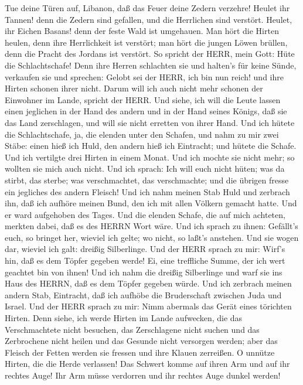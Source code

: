  Tue deine Türen auf, Libanon, daß das Feuer deine Zedern
verzehre!  Heulet ihr Tannen! denn die Zedern sind gefallen,
und die Herrlichen sind verstört. Heulet, ihr Eichen Basans! denn der
feste Wald ist umgehauen.  Man hört die Hirten heulen, denn
ihre Herrlichkeit ist verstört; man hört die jungen Löwen brüllen, denn
die Pracht des Jordans ist verstört.  So spricht der HERR,
mein Gott: Hüte die Schlachtschafe!  Denn ihre Herren
schlachten sie und halten's für keine Sünde, verkaufen sie und sprechen:
Gelobt sei der HERR, ich bin nun reich! und ihre Hirten schonen ihrer
nicht.  Darum will ich auch nicht mehr schonen der Einwohner
im Lande, spricht der HERR. Und siehe, ich will die Leute lassen einen
jeglichen in der Hand des andern und in der Hand seines Königs, daß sie
das Land zerschlagen, und will sie nicht erretten von ihrer Hand.
 Und ich hütete die Schlachtschafe, ja, die elenden unter
den Schafen, und nahm zu mir zwei Stäbe: einen hieß ich Huld, den andern
hieß ich Eintracht; und hütete die Schafe.  Und ich
vertilgte drei Hirten in einem Monat. Und ich mochte sie nicht mehr; so
wollten sie mich auch nicht.  Und ich sprach: Ich will euch
nicht hüten; was da stirbt, das sterbe; was verschmachtet, das
verschmachte; und die übrigen fresse ein jegliches des andern Fleisch!
 Und ich nahm meinen Stab Huld und zerbrach ihn, daß ich
aufhöre meinen Bund, den ich mit allen Völkern gemacht hatte.
 Und er ward aufgehoben des Tages. Und die elenden Schafe,
die auf mich achteten, merkten dabei, daß es des HERRN Wort wäre.
 Und ich sprach zu ihnen: Gefällt's euch, so bringet her,
wieviel ich gelte; wo nicht, so laßt's anstehen. Und sie wogen dar,
wieviel ich galt: dreißig Silberlinge.  Und der HERR sprach
zu mir: Wirf's hin, daß es dem Töpfer gegeben werde! Ei, eine treffliche
Summe, der ich wert geachtet bin von ihnen! Und ich nahm die dreißig
Silberlinge und warf sie ins Haus des HERRN, daß es dem Töpfer gegeben
würde.  Und ich zerbrach meinen andern Stab, Eintracht, daß
ich aufhöbe die Bruderschaft zwischen Juda und Israel.  Und
der HERR sprach zu mir: Nimm abermals das Gerät eines törichten Hirten.
 Denn siehe, ich werde Hirten im Lande aufwecken, die das
Verschmachtete nicht besuchen, das Zerschlagene nicht suchen und das
Zerbrochene nicht heilen und das Gesunde nicht versorgen werden; aber
das Fleisch der Fetten werden sie fressen und ihre Klauen zerreißen.
 O unnütze Hirten, die die Herde verlassen! Das Schwert
komme auf ihren Arm und auf ihr rechtes Auge! Ihr Arm müsse verdorren
und ihr rechtes Auge dunkel werden!

